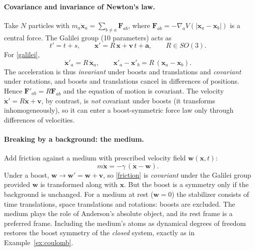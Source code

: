 \paragraph{Covariance and invariance of Newton's law.}
Take $N$ particles with $m_a\ddot{{\bm{x}}}_a=\sum_{b\ne a}\bm F_{ab}$, where
$\bm F_{ab}=-\nabla_{a}V(|{\bm{x}}_a-{\bm{x}}_b|)$ is a central force. The Galilei group
(10 parameters) acts as
\begin{equation}\label{galilei}
  t'=t+s,\qquad {\bm{x}}'=R\,{\bm{x}}+{\bm{v}}\,t+\bm a,\qquad R\in SO(3).
\end{equation}
For \eqref{galilei},
\begin{equation}
  \ddot{{\bm{x}}}'_a=R\,\ddot{{\bm{x}}}_a,\qquad
  {\bm{x}}'_a-{\bm{x}}'_b=R\,({\bm{x}}_a-{\bm{x}}_b).
\end{equation}
The acceleration is thus \emph{invariant} under boosts and translations and
\emph{covariant} under rotations, and boosts and translations cancel in
differences of positions. Hence $\bm F'_{ab}=R\bm F_{ab}$ and the equation of
motion is covariant. The velocity $\dot{\bm{x}}'=R\dot{\bm{x}}+{\bm{v}}$, by contrast, is
\emph{not} covariant under boosts (it transforms inhomogeneously), so it can
enter a boost-symmetric force law only through differences of velocities.

\paragraph{Breaking by a background: the medium.}
Add friction against a medium with prescribed velocity field $\bm w({\bm{x}},t)$:
\begin{equation}\label{friction}
  m\ddot{\bm{x}}=-\gamma\,(\dot{\bm{x}}-\bm w).
\end{equation}
Under a boost, $\bm w\to\bm w'=\bm w+{\bm{v}}$, so \eqref{friction} is
\emph{covariant} under the Galilei group provided $\bm w$ is transformed
along with ${\bm{x}}$. But the boost is a symmetry only if the background is
unchanged. For a medium at rest ($\bm w=0$) the stabilizer consists of time
translations, space translations and rotations: boosts are excluded. The medium
plays the role of Anderson's absolute object, and its rest frame is a
preferred frame. Including the medium's atoms as dynamical degrees of
freedom restores the boost symmetry of the \emph{closed} system, exactly as in
Example~\ref{ex:coulomb}.

